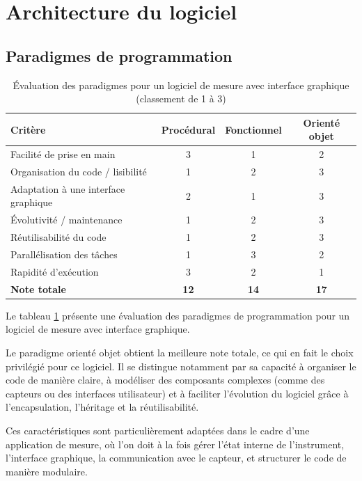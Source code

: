 \section{Architecture du logiciel}
\subsection{Paradigmes de programmation}

\begin{table}[H]
    \centering
    \begin{tabular}{|l|c|c|c|}
        \hline
        \textbf{Critère} & \textbf{Procédural} & \textbf{Fonctionnel} & \textbf{Orienté objet} \\
        \hline
        Facilité de prise en main & 3 & 1 & 2 \\
        Organisation du code / lisibilité & 1 & 2 & 3 \\
        Adaptation à une interface graphique & 2 & 1 & 3 \\
        Évolutivité / maintenance & 1 & 2 & 3 \\
        Réutilisabilité du code & 1 & 2 & 3 \\
        Parallélisation des tâches & 1 & 3 & 2 \\
        Rapidité d'exécution & 3 & 2 & 1 \\
        \hline
        \textbf{Note totale} & \textbf{12} & \textbf{14} & \textbf{17} \\
        \hline
    \end{tabular}
    \caption{Évaluation des paradigmes pour un logiciel de mesure avec interface graphique (classement de 1 à 3)}
    \label{tab:comparatif_paradigmes}
\end{table}

Le tableau \ref{tab:comparatif_paradigmes} présente une évaluation des paradigmes de programmation pour un logiciel de mesure avec interface graphique.

Le paradigme orienté objet obtient la meilleure note totale, ce qui en fait le choix privilégié pour ce logiciel. Il se distingue notamment par sa capacité à organiser le code de manière claire, à modéliser des composants complexes (comme des capteurs ou des interfaces utilisateur) et à faciliter l’évolution du logiciel grâce à l’encapsulation, l’héritage et la réutilisabilité.

Ces caractéristiques sont particulièrement adaptées dans le cadre d'une application de mesure, où l’on doit à la fois gérer l’état interne de l’instrument, l’interface graphique, la communication avec le capteur, et structurer le code de manière modulaire.

